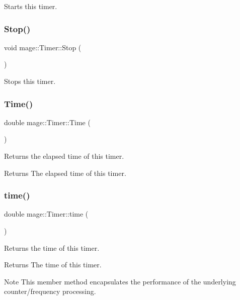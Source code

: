 Starts this timer. \hypertarget{classmage_1_1_timer_abf234f1e2ee9e760f316bd49500d5a3a}{}\label{classmage_1_1_timer_abf234f1e2ee9e760f316bd49500d5a3a} 
\subsubsection{\texorpdfstring{Stop()}{Stop()}}
{\footnotesize\ttfamily void mage\+::\+Timer\+::\+Stop (\begin{DoxyParamCaption}{ }\end{DoxyParamCaption})}

Stops this timer. \hypertarget{classmage_1_1_timer_a5e4655ac296cc8971b54e5a76082f00f}{}\label{classmage_1_1_timer_a5e4655ac296cc8971b54e5a76082f00f} 
\subsubsection{\texorpdfstring{Time()}{Time()}}
{\footnotesize\ttfamily double mage\+::\+Timer\+::\+Time (\begin{DoxyParamCaption}{ }\end{DoxyParamCaption})}

Returns the elapsed time of this timer.

\begin{DoxyReturn}{Returns}
The elapsed time of this timer. 
\end{DoxyReturn}
\hypertarget{classmage_1_1_timer_a782882e9dbe9a2843b5203ba13309b23}{}\label{classmage_1_1_timer_a782882e9dbe9a2843b5203ba13309b23} 
\subsubsection{\texorpdfstring{time()}{time()}}
{\footnotesize\ttfamily double mage\+::\+Timer\+::time (\begin{DoxyParamCaption}{ }\end{DoxyParamCaption})\hspace{0.3cm}{\ttfamily [private]}}

Returns the time of this timer.

\begin{DoxyReturn}{Returns}
The time of this timer. 
\end{DoxyReturn}
\begin{DoxyNote}{Note}
This member method encapsulates the performance of the underlying counter/frequency processing. 
\end{DoxyNote}


